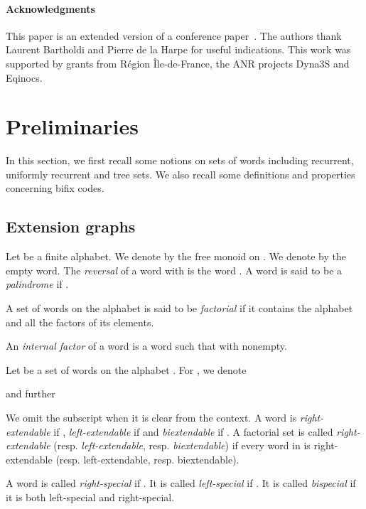\documentclass[preprint,12pt]{elsarticle}
\numberwithin{theorem}{section}
\numberwithin{equation}{section}
\numberwithin{figure}{section}
\numberwithin{table}{section}
\begin{document}
\paragraph{Acknowledgments}
This paper is an extended version of a conference paper~\cite{words2015}.
The authors thank  Laurent Bartholdi and Pierre de la Harpe for useful indications.
This work was supported by grants from R\'egion \^{I}le-de-France, the ANR projects Dyna3S and Eqinocs.










\section{Preliminaries}
\label{sectionPreliminaries}
In this section, we first recall some notions on sets of words including recurrent, uniformly recurrent and tree sets.
We also recall some definitions and properties concerning bifix codes.





\subsection{Extension graphs}
Let  be a finite alphabet.
We denote by  the free monoid on .
We denote by  the empty word.
The \emph{reversal} of a word  with  is the word .
A word  is said to be a \emph{palindrome} if .

A set of words on the alphabet  is said to be \emph{factorial} if it contains the alphabet  and all the factors of its elements. 

An \emph{internal factor} of a word  is a word  such that  with  nonempty.

Let  be a  set of words on the alphabet .
For , we denote

and further

We omit the subscript  when it is clear from the context.
A word  is \emph{right-extendable} if ,
\emph{left-extendable} if  and \emph{biextendable} if
. A 
factorial set
 is called \emph{right-extendable}
(resp. \emph{left-extendable}, resp. \emph{biextendable}) if every word in  is
right-extendable (resp. left-extendable, resp. biextendable).

A word  is called \emph{right-special} if . 
It is called \emph{left-special} if . 
It is called \emph{bispecial} if it is
both left-special and right-special.
\end{document}
